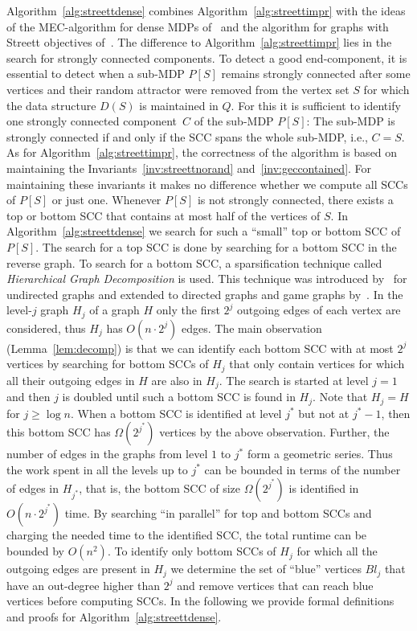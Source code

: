 \documentclass[11pt,letterpaper]{article}
\newcommand{\mdp}{P\xspace}
\newcommand{\scc}{C\xspace}
\newcommand{\blue}{\mathit{Bl}}
\newcommand{\ds}{\mathit{D}\xspace}
\begin{document}
Algorithm~\ref{alg:streettdense} combines Algorithm~\ref{alg:streettimpr}
with the ideas of the MEC-algorithm for dense MDPs of~\cite{ChatterjeeH14} and 
the algorithm for graphs with Streett objectives of~\cite{ChatterjeeHL15}.
The difference to Algorithm~\ref{alg:streettimpr} lies in the search for 
strongly connected components. To detect a good end-component, it is essential 
to detect when a sub-MDP $\mdp[S]$ remains strongly connected after some 
vertices and their random attractor were removed from the vertex 
set $S$ for which the data structure $\ds(S)$ is
maintained in $Q$. For this it is sufficient to identify one 
strongly connected component~$\scc$ of the sub-MDP $\mdp[S]$:
The sub-MDP is strongly connected if and only if the SCC spans the whole 
sub-MDP, i.e., $\scc = S$.
As for Algorithm~\ref{alg:streettimpr}, the correctness of the algorithm
is based on maintaining the Invariants~\ref{inv:streettnorand}
and~\ref{inv:geccontained}. For maintaining these invariants it makes no difference
whether we compute all SCCs of $\mdp[S]$ or just one. Whenever $\mdp[S]$ is not 
strongly connected, there exists a top or bottom SCC that contains at most 
half of the vertices of $S$. In 
Algorithm~\ref{alg:streettdense} we search for such a ``small'' top or bottom
SCC of $\mdp[S]$. 
The search for a top SCC is done by searching for a bottom SCC in the reverse
graph. To search for a bottom SCC,
a sparsification technique called \emph{Hierarchical Graph Decomposition}
is used. This technique was introduced by~\cite{HenzingerKW99} for undirected 
graphs and extended to directed graphs and game graphs by~\cite{ChatterjeeH14}.
In the level-$j$ graph $H_j$ of a graph $H$ only the first $2^j$ outgoing edges 
of each vertex are considered, thus $H_j$ has $O(n \cdot 2^j)$ edges. The main
observation (Lemma~\ref{lem:decomp}) is that we can identify each bottom SCC 
with at most $2^j$ vertices by searching for bottom SCCs of $H_j$ that 
only contain vertices for which all their outgoing edges in $H$ are also in $H_j$.
The search is started at level $j = 1$ and then $j$ is doubled until such a bottom
SCC is found in $H_j$. Note that $H_j = H$ for $j \ge \log n$. When a bottom 
SCC is identified at level $j^*$ but not at $j^*-1$, then this bottom SCC has 
$\Omega(2^{j^*})$ vertices by the above observation. Further, the number of 
edges in the graphs from level $1$ to $j^*$ form a geometric series. Thus 
the work spent in all the levels up to $j^*$ can be bounded in terms of the number of
edges in $H_{j^*}$, that is, the bottom SCC of size $\Omega(2^{j^*})$ is 
identified in $O(n \cdot 2^{j^*})$ time. By searching ``in parallel'' for 
top and bottom SCCs and charging the needed time to the identified SCC, 
the total runtime can be bounded by $O(n^2)$. To identify only bottom SCCs of $H_j$
for which all the outgoing edges are present in $H_j$ we determine the 
set of ``blue'' vertices $\blue_j$ that have an out-degree higher than $2^j$
and remove vertices that can reach blue vertices before computing SCCs.
In the following we provide formal definitions and proofs for Algorithm~\ref{alg:streettdense}.
\end{document}
